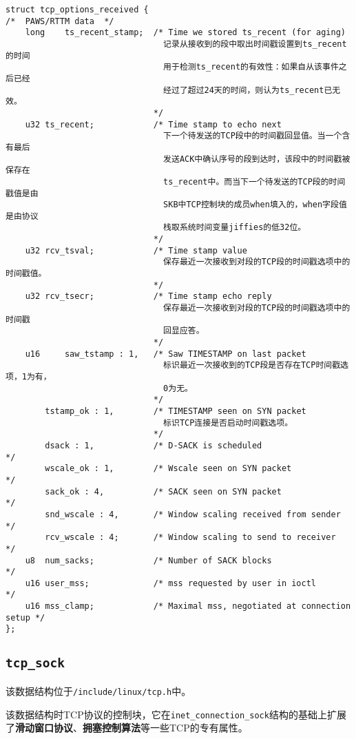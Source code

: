 \begin{verbatim}
struct tcp_options_received {
/*  PAWS/RTTM data  */
    long    ts_recent_stamp;  /* Time we stored ts_recent (for aging)        
								记录从接收到的段中取出时间戳设置到ts_recent的时间
								用于检测ts_recent的有效性：如果自从该事件之后已经
								经过了超过24天的时间，则认为ts_recent已无效。
							  */
    u32 ts_recent;            /* Time stamp to echo next                     
								下一个待发送的TCP段中的时间戳回显值。当一个含有最后
								发送ACK中确认序号的段到达时，该段中的时间戳被保存在
								ts_recent中。而当下一个待发送的TCP段的时间戳值是由
								SKB中TCP控制块的成员when填入的，when字段值是由协议
								栈取系统时间变量jiffies的低32位。
					          */
    u32 rcv_tsval;            /* Time stamp value                            
								保存最近一次接收到对段的TCP段的时间戳选项中的时间戳值。
							  */
    u32 rcv_tsecr;            /* Time stamp echo reply                       
								保存最近一次接收到对段的TCP段的时间戳选项中的时间戳
								回显应答。
							  */
    u16     saw_tstamp : 1,   /* Saw TIMESTAMP on last packet                
								标识最近一次接收到的TCP段是否存在TCP时间戳选项，1为有，
								0为无。
							  */
        tstamp_ok : 1,        /* TIMESTAMP seen on SYN packet                
								标识TCP连接是否启动时间戳选项。
							  */
        dsack : 1,            /* D-SACK is scheduled                         */
        wscale_ok : 1,        /* Wscale seen on SYN packet                   */
        sack_ok : 4,          /* SACK seen on SYN packet                     */
        snd_wscale : 4,       /* Window scaling received from sender         */
        rcv_wscale : 4;       /* Window scaling to send to receiver          */
    u8  num_sacks;            /* Number of SACK blocks                       */
    u16 user_mss;             /* mss requested by user in ioctl              */
    u16 mss_clamp;            /* Maximal mss, negotiated at connection setup */
};
\end{verbatim}            
        \subsection{\texttt{tcp_sock}}

            该数据结构位于\texttt{/include/linux/tcp.h}中。

            该数据结构时TCP协议的控制块，它在\texttt{inet_connection_sock}结构的基础上扩展了\textbf{滑动窗口协议}、\textbf{拥塞控制算法}等一些TCP的专有属性。
            
